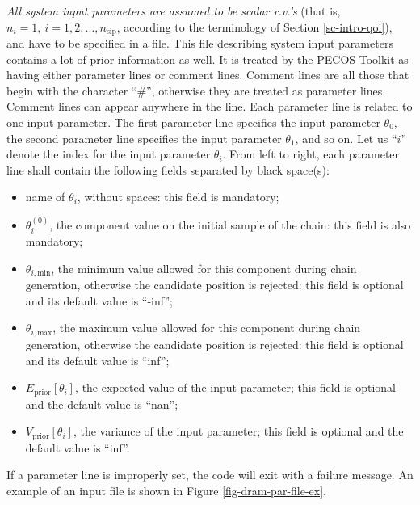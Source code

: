 {\it All system input parameters are assumed to be scalar r.v.'s} (that is, $n_i=1,~i=1,2,\ldots,n_{\text{sip}}$, according to the terminology of Section \ref{sc-intro-qoi}), and
have to be specified in a file.
This file describing system input parameters contains a lot of prior information as well.
It is treated by the PECOS Toolkit as having either parameter lines or comment lines.
Comment lines are all those that begin with the character ``\#'', otherwise they are treated as parameter lines.
Comment lines can appear anywhere in the line.
Each parameter line is related to one input parameter.
The first parameter line specifies the input parameter $\theta_0$,
the second parameter line specifies the input parameter $\theta_1$,
and so on.
Let us ``$i$'' denote the index for the input parameter $\theta_i$.
From left to right, each parameter line shall contain the following fields separated by black space(s):
\begin{itemize}
\item name of $\theta_i$, without spaces: this field is mandatory;
\item $\theta_i^{(0)}$, the component value on the initial sample of the chain: this field is also mandatory;
\item $\theta_{i,\text{min}}$, the minimum value allowed for this component during chain generation, otherwise the candidate position is rejected: this field is optional and its default value is ``-inf'';
\item $\theta_{i,\text{max}}$, the maximum value allowed for this component during chain generation, otherwise the candidate position is rejected: this field is optional and its default value is ``inf'';
\item $E_{\text{prior}}[\theta_i]$, the expected value of the input parameter; this field is optional and the default value is ``nan'';
\item $V_{\text{prior}}[\theta_i]$, the variance of the input parameter; this field is optional and the default value is ``inf''.
\end{itemize}
If a parameter line is improperly set, the code will exit with a failure message.
An example of an input file is shown in Figure \ref{fig-dram-par-file-ex}.

